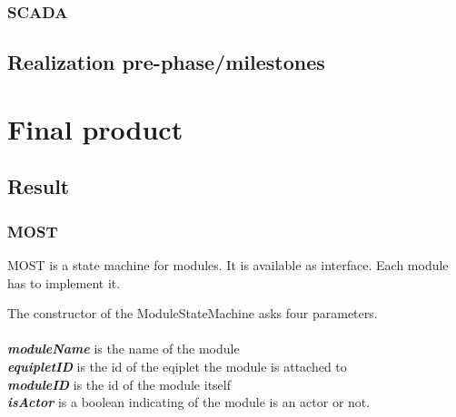 \documentclass[12pt,a4paper]{report}
\begin{document}
\subsection{SCADA}

\newpage
\section{Realization pre-phase/milestones}

\chapter{Final product}
\section{Result}
\subsection{MOST}

\begin{figure}
\end{figure}

MOST is a state machine for modules.
It is available as interface.
Each module has to implement it. 

The constructor of the ModuleStateMachine asks four parameters. \\
\\
\textbf{\textit{moduleName}} is the name of the module \\
\textbf{\textit{equipletID}} is the id of the eqiplet the module is attached to \\
\textbf{\textit{moduleID}} is the id of the module itself \\
\textbf{\textit{isActor}} is a boolean indicating of the module is an actor or not. \\
\end{document}
